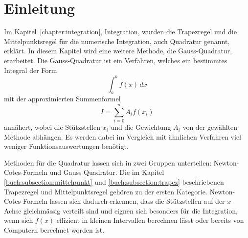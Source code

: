 %
%
%
\section{Einleitung\label{quadratur:section:einleitung}}

Im Kapitel~\ref{chapter:integration}, Integration, wurden die 
Trapezregel und die Mittelpunktsregel für die numerische Integration, 
auch Quadratur genannt, erklärt. 
In diesem Kapitel wird eine weitere Methode, die Gauss-Quadratur, erarbeitet.
Die Gauss-Quadratur ist ein Verfahren, welches ein bestimmtes Integral der Form
\begin{equation}
    \int_{a}^{b} f(x) \,dx
\end{equation}
mit der approximierten Summenformel
\begin{equation} \label{quadratur:equation:quadraturapproxsumme}
    I = \sum_{i=0}^{n} A_i f(x_i)
\end{equation}
annähert, wobei die Stützstellen $x_i$ und die Gewichtung $A_i$ von der gewählten 
Methode abhängen. 
Es werden dabei im Vergleich mit ähnlichen Verfahren viel weniger Funktionsauswertungen benötigt.

Methoden für die Quadratur lassen sich in zwei Gruppen unterteilen: 
Newton-Cotes-Formeln und Gauss Quadratur.
Die im Kapitel \ref{buch:subsection:mittelpunkt} und \ref{buch:subsection:trapez} beschriebenen
Trapezregel und Mittelpunktsregel gehören zu der ersten Kategorie.
Newton-Cotes-Formeln lassen sich dadurch erkennen, dass die Stützstellen auf der $x$-Achse 
gleichmässig verteilt sind und eignen sich besonders für die Integration, wenn sich $f(x)$ 
effizient in kleinen Intervallen berechnen lässt oder bereits von Computern berechnet worden ist.







